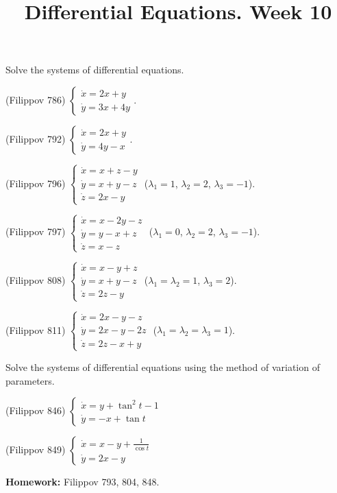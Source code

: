 \documentclass[14pt]{exam}
\title{Differential Equations. Week 10}
\date{}
\begin{document}
	\maketitle
	
	Solve the systems of differential equations.
	
	\begin{questions}
		\question
		(Filippov 786)
		$
		\begin{cases}
			\dot{x} = 2x + y\\
			\dot{y} = 3x + 4y
		\end{cases}
		$.
		
		\question
		(Filippov 792)
		$
		\begin{cases}
			\dot{x} = 2x + y\\
			\dot{y} = 4y - x
		\end{cases}
		$.
		
		\question
		(Filippov 796)
		$\begin{cases}
			\dot{x} = x + z - y\\
			\dot{y} = x + y - z\\
			\dot{z} = 2x - y
		\end{cases}$ ($\lambda_1 = 1$, $\lambda_2 = 2$, $\lambda_3 = -1$).
		
		\question
		(Filippov 797)
		$\begin{cases}
			\dot{x} = x - 2y - z\\
			\dot{y} = y - x + z\\
			\dot{z} = x - z
		\end{cases}$ ($\lambda_1 = 0$, $\lambda_2 = 2$, $\lambda_3 = -1$).
		
		\question
		(Filippov 808)
		$\begin{cases}
			\dot{x} = x - y + z\\
			\dot{y} = x + y - z\\
			\dot{z} = 2z - y
		\end{cases}$ ($\lambda_1 = \lambda_2 = 1$, $\lambda_3 = 2$).
		
		\question
		(Filippov 811)
		$\begin{cases}
			\dot{x} = 2x - y - z\\
			\dot{y} = 2x - y - 2z\\
			\dot{z} = 2z - x + y
		\end{cases}$ ($\lambda_1 = \lambda_2 = \lambda_3 = 1$).
	\end{questions}
	
	Solve the systems of differential equations using the method of variation of parameters.
	\begin{questions}
		\setcounter{question}{6}
		
		\question
		(Filippov 846)
		$\begin{cases}
			\dot{x} = y + \tan^2 t - 1\\
			\dot{y} = -x + \tan t
		\end{cases}$
		
		\question
		(Filippov 849)
		$\begin{cases}
			\dot{x} = x - y + \frac{1}{\cos t}\\
			\dot{y} = 2x - y
		\end{cases}$
	\end{questions}
	
	\textbf{Homework:} Filippov 793, 804, 848.
\end{document}
